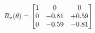 \documentclass[preview]{standalone}
\begin{document}
\begin{align*}
\special{dvisvgm:raw <g id='unique000'>}R_{x}(\theta) = \begin{bmatrix}1 & 0 & 0 \\0 & -0.81 & +0.59 \\0 & -0.59 & -0.81\end{bmatrix}\special{dvisvgm:raw </g>}
\end{align*}
\end{document}
